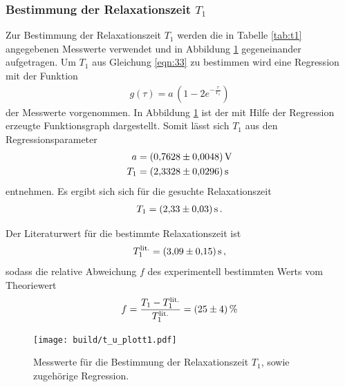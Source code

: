 \subsubsection{Bestimmung der Relaxationszeit $T_{1}$}
\label{subsubsec:T1}
Zur Bestimmung der Relaxationszeit $T_{1}$ werden die in Tabelle \ref{tab:t1} angegebenen
Messwerte verwendet und in Abbildung \ref{fig:T_1bestimmung} gegeneinander aufgetragen.
Um $T_{1}$ aus Gleichung \eqref{eqn:33} zu bestimmen wird eine Regression
mit der Funktion
\begin{align}
  \label{eqn:t1_bestimmung}
  g(\tau) = a \, \left( 1 - 2 e^{-\frac{\tau}{T_{1}}} \right)
\end{align}
der Messwerte vorgenommen. In Abbildung \ref{fig:T_1bestimmung} ist
der mit Hilfe der Regression erzeugte Funktionsgraph dargestellt.
Somit lässt sich $T_{1}$ aus den Regressionsparameter
\begin{align*}
  a &= \SI{0.7628+-0.0048}{\volt}\\
  T_{1} &= \SI{2.3328+-0.0296}{\second}
\end{align*}
entnehmen.
Es ergibt sich sich für die gesuchte Relaxationszeit
\begin{align*}
  T_{1} = \SI{2.33+-0.03}{\second} \, .
\end{align*}


Der Literaturwert\cite{litwerte} für die bestimmte Relaxationszeit ist
\begin{align*}
  T_{1}^\text{lit.} = \SI{3.09+-0.15}{\second} \, ,
\end{align*}
sodass die relative Abweichung $f$ des experimentell bestimmten Werts
vom Theoriewert
\begin{align*}
  f = \frac{T_{1} - T_{1}^\text{lit.}}{T_{1}^\text{lit.}} = \SI{25+-4}{\percent}
\end{align*}


\begin{figure}[hhh]
  \centering
  \texttt{[image: build/t\_u\_plott1.pdf]}
  \caption{Messwerte für die Bestimmung der Relaxationszeit $T_{1}$, sowie zugehörige Regression.}
  \label{fig:T_1bestimmung}
\end{figure}


